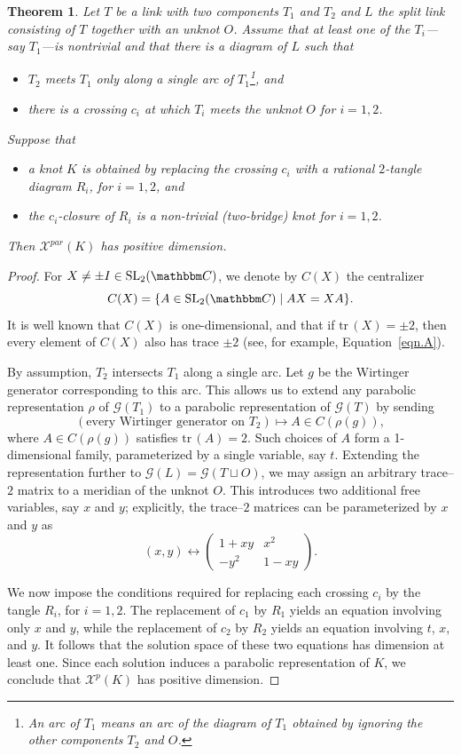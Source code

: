 \documentclass[12pt,reqno]{amsart}
\newtheorem{theorem}{Theorem}[section]
\theoremstyle{definition}
\def\BC{\mathbbm C}
\def\calG{\mathcal G}
\def\calX{\mathcal X}
\def\tr{\mathrm{tr}\,}
\begin{document}
\begin{theorem}\label{thm.replace2}
Let $T$ be a link with two components $T_1$ and $T_2$ and  $L$ the split link consisting of $T$ together with an unknot $O$.
Assume that at least one of the $T_i$---say $T_1$---is nontrivial and that there is a diagram of $L$ such that
\begin{itemize}
    \item $T_2$ meets $T_1$ only along a single arc of $T_1$\footnote{An arc of $T_1$ means an arc of the diagram of $T_1$ obtained by ignoring the other components $T_2$ and $O$.}, and
    \item there is a crossing $c_i$ at which $T_i$ meets the unknot $O$ for $i=1,2$.
\end{itemize}
Suppose that 
\begin{itemize}
    \item a knot $K$ is obtained by replacing the crossing $c_i$ with a rational $2$-tangle diagram $R_i$, for $i=1,2$, and
    \item the $c_i$-closure of $R_i$ is a non-trivial (two-bridge) knot for $i=1,2$.
\end{itemize}
Then $\calX^{par}(K)$ has positive dimension.
\end{theorem}

\begin{proof}
For $X \neq \pm I \in \mathrm{SL}_2(\BC)$, we denote by $C(X)$ the centralizer
\[
C(X)=\{ A \in \mathrm{SL}_2(\BC) \mid AX = XA \}.
\]
It is well known that $C(X)$ is one-dimensional, and that if $\tr(X)=\pm 2$, then every element of $C(X)$ also has trace $\pm 2$ (see, for example, Equation~\eqref{eqn.A}).

By assumption, $T_2$ intersects $T_1$ along a single arc. Let $g$ be the Wirtinger generator corresponding to this arc. This allows us to extend any parabolic representation $\rho$ of $\calG(T_1)$ to a parabolic representation of $\calG(T)$ by sending
\[
(\text{every Wirtinger generator on } T_2) \longmapsto A \in C(\rho(g)),
\]
where $A \in C(\rho(g))$ satisfies $\tr(A)=2$. Such choices of $A$ form a 1-dimensional family,  parameterized by a single variable, say $t$.
Extending the representation further to $\calG(L)=\calG(T \sqcup O)$, we may assign an arbitrary trace--$2$ matrix to a meridian of the unknot $O$. This introduces two additional free variables, say $x$ and $y$; explicitly, the trace--$2$ matrices can be parameterized by $x$ and $y$ as
$$ (x,y) \longleftrightarrow \begin{pmatrix}
    1 + x y & x^2 \\
    -y^2 & 1-xy 
\end{pmatrix}.$$

We now impose the conditions required for replacing each crossing $c_i$ by the tangle $R_i$, for $i=1,2$. The replacement of $c_1$ by $R_1$ yields an equation involving only $x$ and $y$, while the replacement of $c_2$ by $R_2$ yields an equation involving $t$, $x$, and $y$. It follows that the solution space of these two equations has dimension at least one. Since each solution induces a parabolic representation of $K$, we conclude that $\calX^{p}(K)$ has positive dimension.
\end{proof}
\end{document}
